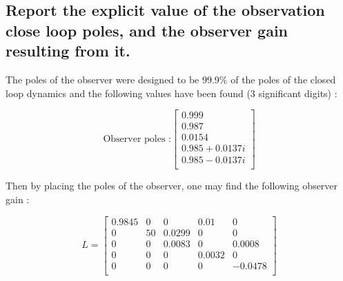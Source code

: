 \subsection{Report the explicit value of the observation close loop poles, and the observer gain resulting
from it.}
The poles of the observer were designed to be 99.9\% of the poles of the closed loop dynamics and the following values have been found (3 significant digits) :

\begin{equation}
    \text{Observer poles :}
    \left[\begin{array}{c}
         0.999\\
         0.987\\
         0.0154\\
         0.985 + 0.0137i\\
         0.985 - 0.0137i\\
    \end{array}
    \right]
\end{equation}

Then by placing the poles of the observer, one may find the following observer gain :

\begin{equation}
    L = 
    \left[ {\begin{array}{ccccc}
        0.9845 &0  &0      &0.01   &0         \\
        0      &50 &0.0299 &0      &0         \\
        0      &0  &0.0083 &0      &0.0008    \\
        0      &0  &0      &0.0032 &0         \\
        0      &0  &0      &0      &-0.0478   \\
    \end{array} } \right] 
\end{equation}

